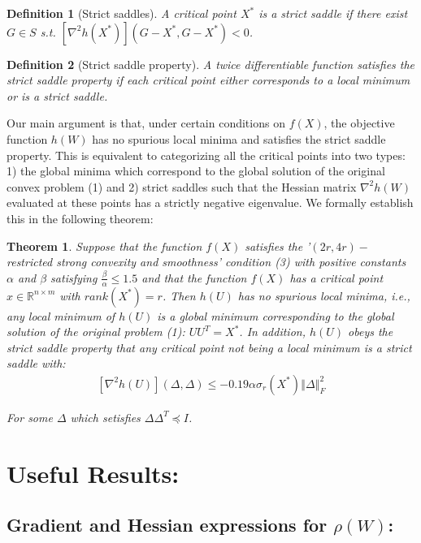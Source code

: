 \documentclass{article}
\newtheorem{theorem}{Theorem}
\newtheorem{definition}{Definition}
\begin{document}
\begin{definition}[Strict saddles]
A critical point $X^*$ is a strict saddle if there exist $G\in S$ s.t. $\left[\nabla^2 h\left(X^*\right)\right]\left(G-X^*,G-X^*\right) < 0$.
\end{definition}

\begin{definition}[Strict saddle property]
A twice differentiable function satisfies the strict saddle property if each critical point either corresponds to a local minimum or is a strict saddle.
\end{definition}

Our main argument is that, under certain conditions on $f(X)$, the objective function $h(W)$ has no spurious local minima and satisfies the strict saddle property. This is equivalent to categorizing all the critical points into two types: 1) the global minima which correspond to the global solution of the original convex problem (1) and 2) strict saddles such that the Hessian matrix $\nabla^2h\left(W\right)$ evaluated at these points has a strictly negative eigenvalue. We formally establish this in the following theorem:

\begin{theorem}
Suppose that the function $f(X)$ satisfies the '$(2r, 4r)-$restricted strong convexity and smoothness' condition (3) with positive constants $\alpha$ and $\beta$ satisfying $\frac{\beta}{\alpha} \le 1.5$ and that the function $f(X)$ has a critical point $x\in \mathbb{R}^{n\times m}$ with $rank(X^*) = r$. Then $h(U)$ has no spurious local minima, i.e., any local minimum of $h(U)$ is a global minimum corresponding to the global solution of the original problem (1): $UU^T = X^*$. In addition, $h(U)$ obeys the strict saddle property that any critical point not being a local minimum is a strict saddle with:
\begin{align*}
    \left[\nabla^{2}h\left(U\right)\right]\left(\Delta,\Delta\right)\le-0.19\alpha\sigma_r\left(X^*\right)\left\Vert\Delta\right\Vert^2_F
\end{align*}

For some $\Delta$ which setisfies $\Delta\Delta^T\preceq I$.
\end{theorem}


\section{Useful Results:}

\subsection{Gradient and Hessian expressions for $\rho\left(W\right)$:}
\end{document}
